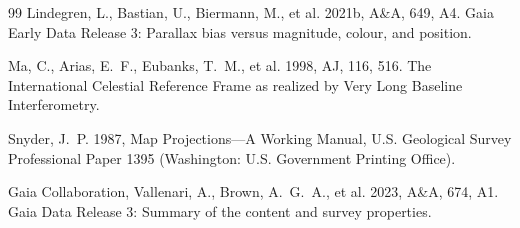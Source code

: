 \documentclass[11pt]{article}
\begin{document}
\begin{thebibliography}{99}
Lindegren, L., Bastian, U., Biermann, M., et al. 2021b, A\&A, 649, A4.
Gaia Early Data Release 3: Parallax bias versus magnitude, colour, and position.

Ma, C., Arias, E.~F., Eubanks, T.~M., et al. 1998, AJ, 116, 516.
The International Celestial Reference Frame as realized by Very Long Baseline
Interferometry.

Snyder, J.~P. 1987, Map Projections---A Working Manual, U.S. Geological Survey
Professional Paper 1395 (Washington: U.S. Government Printing Office).

Gaia Collaboration, Vallenari, A., Brown, A.~G.~A., et al. 2023, A\&A, 674, A1.
Gaia Data Release 3: Summary of the content and survey properties.

\end{thebibliography}
\end{document}
